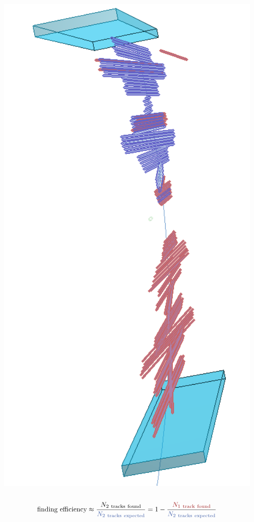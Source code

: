 \documentclass[18pt, aspectratio=169]{beamer}
\begin{document}
\begin{frame}
\begin{columns}
\begin{column}{0.2\textwidth}
      \includegraphics[width=1.0\textwidth]{figures/b2display_screenshots/gcr_data_2017-08_run3940_2326_finding-fail-musterevent_3d.png}
    \end{column}
  \end{columns}

  \begin{equation*}
    \label{eq:cosmic_eff}
    \text{finding efficiency} \approx \frac{N_\mathrm{2\ tracks\ found}}{\textcolor{kit-blue100}{N_\mathrm{2\ tracks\ expected}}}
    = 1 - \frac{\textcolor{kit-red100}{N_\mathrm{1\ track\ found}}}{\textcolor{kit-blue100}{N_\mathrm{2\ tracks\ expected}}}
  \end{equation*}             %

\end{frame}
\end{document}
